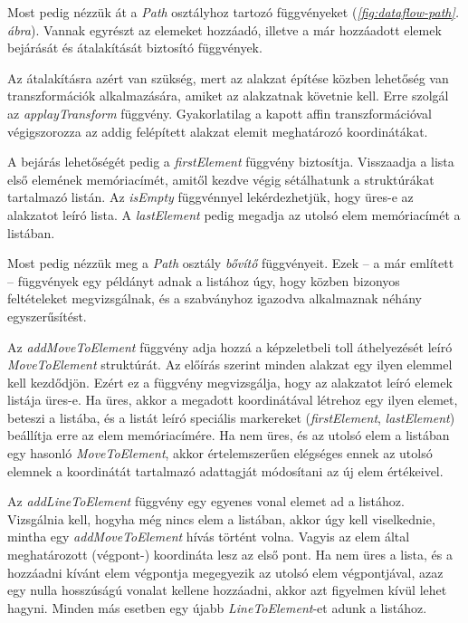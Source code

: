 \documentclass[12pt]{report}
\theoremstyle{definition}
\newcommand{\func}[1]{{\textsl{#1}}}
\begin{document}
Most pedig nézzük át a \func{Path} osztályhoz tartozó függvényeket
(\emph{\ref{fig:dataflow-path}. ábra}). Vannak egyrészt az elemeket
hozzáadó, illetve a már hozzáadott elemek bejárását és átalakítását biztosító
függvények.

Az átalakításra azért van szükség, mert az alakzat építése közben lehetőség van
transzformációk alkalmazására, amiket az alakzatnak követnie kell. Erre szolgál
az \func{applayTransform} függvény. Gyakorlatilag a kapott affin
transzformációval végigszorozza az addig felépített alakzat elemit
meghatározó koordinátákat.

A bejárás lehetőségét pedig a \func{firstElement} függvény biztosítja.
Visszaadja a lista első elemének memóriacímét, amitől kezdve végig sétálhatunk
a struktúrákat tartalmazó listán. Az \func{isEmpty} függvénnyel
lekérdezhetjük, hogy üres-e az alakzatot leíró lista. A \func{lastElement}
pedig megadja az utolsó elem memóriacímét a listában.

Most pedig nézzük meg a \func{Path} osztály \emph{bővítő} függvényeit. Ezek --
a már említett -- függvények egy példányt adnak a listához úgy, hogy közben
bizonyos feltételeket megvizsgálnak, és a szabványhoz igazodva alkalmaznak
néhány egyszerűsítést.

Az \func{addMoveToElement} függvény adja hozzá a képzeletbeli toll áthelyezését
leíró \func{MoveToElement} struktúrát. Az előírás szerint minden alakzat egy
ilyen elemmel kell kezdődjön. Ezért ez a függvény megvizsgálja, hogy az
alakzatot leíró elemek listája üres-e. Ha üres, akkor a megadott koordinátával
létrehoz egy ilyen elemet, beteszi a listába, és a listát leíró speciális
markereket (\func{firstElement}, \func{lastElement}) beállítja erre az elem
memóriacímére. Ha nem üres, és az utolsó elem a listában egy hasonló
\func{MoveToElement}, akkor értelemszerűen elégséges ennek az utolsó elemnek a
koordinátát tartalmazó adattagját módosítani az új elem értékeivel.

Az \func{addLineToElement} függvény egy egyenes vonal elemet ad a listához.
Vizsgálnia kell, hogyha még nincs elem a listában, akkor úgy kell viselkednie,
mintha egy \func{addMoveToElement} hívás történt volna. Vagyis az elem által
meghatározott (végpont-) koordináta lesz az első pont. Ha nem üres a lista, és a
hozzáadni kívánt elem végpontja megegyezik az utolsó elem végpontjával, azaz
egy nulla hosszúságú vonalat kellene hozzáadni, akkor azt figyelmen kívül lehet
hagyni. Minden más esetben egy újabb \func{LineToElement}-et adunk a listához.
\end{document}
